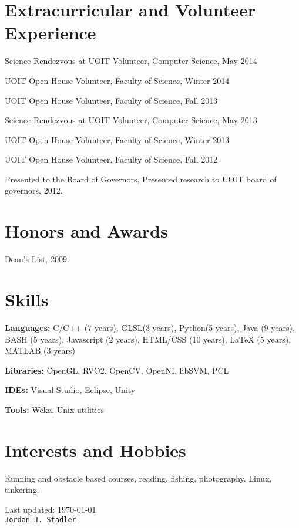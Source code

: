 \documentclass[letterpaper]{article}
\def\footerlink{Jordan J. Stadler}
\renewenvironment{itemize}{
  \begin{list}{}{
    \setlength{\leftmargin}{1.5em}
  }
}{
  \end{list}
}
\begin{document}
\section*{Extracurricular and Volunteer Experience}
\begin{itemize}
\item Science Rendezvous at UOIT Volunteer, Computer Science, May 2014
\item UOIT Open House Volunteer, Faculty of Science, Winter 2014
\item UOIT Open House Volunteer, Faculty of Science, Fall 2013
\item Science Rendezvous at UOIT Volunteer, Computer Science, May 2013
\item UOIT Open House Volunteer, Faculty of Science, Winter 2013
\item UOIT Open House Volunteer, Faculty of Science, Fall 2012
\item Presented to the Board of Governors, Presented research to UOIT board of governors, 2012.
\end{itemize}


\section*{Honors and Awards}
\begin{itemize}
\item Dean's List, 2009.
\end{itemize}

\section*{Skills}
  \begin{itemize}
    \item \textbf{Languages:} C/C++ (7 years), GLSL(3 years), Python(5 years), 
    Java (9 years), BASH (5 years),  Javascript (2 years), HTML/CSS (10 years), 
    LaTeX (5 years), MATLAB (3 years)
    \item \textbf{Libraries:} OpenGL, RVO2, OpenCV, OpenNI, libSVM, PCL
    \item \textbf{IDEs:}  Visual Studio, Eclipse, Unity
    \item \textbf{Tools:}  Weka, Unix utilities
  \end{itemize}

\section*{Interests and Hobbies}
\begin{itemize}
\item Running and obstacle based courses, reading, fishing, photography, Linux, tinkering.
\item 
\end{itemize}


\bigskip

\begin{center}
  \begin{footnotesize}
    Last updated: \today \\
    \href{\footerlink}{\texttt{\footerlink}}
  \end{footnotesize}
\end{center}
\end{document}
